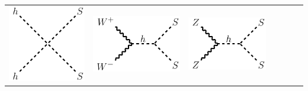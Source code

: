 \begin{table}[t!]
\begin{tabular}{|c|cccccc|}
  \includegraphics[scale=0.32]{figures/feynman_diagrams/hhssfeynman.pdf} &
  \includegraphics[scale=0.32]{figures/feynman_diagrams/wwssfeynman.pdf} &
  \includegraphics[scale=0.32]{figures/feynman_diagrams/zzssfeynman.pdf} &

\end{tabular}
\end{table}
